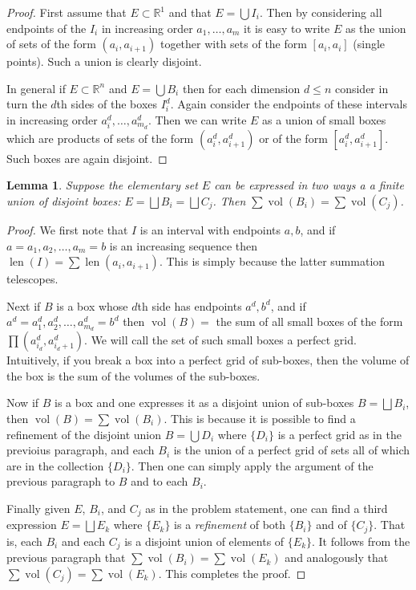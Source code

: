 \documentclass[11pt,oneside]{amsbook}
\newcommand{\RR}{{\mathbb R}}
\DeclareMathOperator{\len}{len}
\DeclareMathOperator{\vol}{vol}
\theoremstyle{definition}
\theoremstyle{plain}
\newtheorem{lem}[thm]{Lemma}
\theoremstyle{definition}
\theoremstyle{remark}
\numberwithin{equation}{section}
\numberwithin{figure}{section}
\begin{document}
\begin{proof}
  First assume that $E\subset\RR^1$ and that $E=\bigcup I_i$. Then by considering all endpoints of the $I_i$ in increasing order $a_1,\ldots,a_m$ it is easy to write $E$ as the union of sets of the form $(a_i,a_{i+1})$ together with sets of the form $[a_i,a_i]$ (single points). Such a union is clearly disjoint.

  In general if $E\subset\RR^n$ and $E=\bigcup B_i$ then for each dimension $d\leq n$ consider in turn the $d$th sides of the boxes $I_i^d$. Again consider the endpoints of these intervals in increasing order $a_i^d,\ldots,a_{m_d}^d$. Then we can write $E$ as a union of small boxes which are products of sets of the form $(a_i^d,a_{i+1}^d)$ or of the form $[a_i^d,a_{i+1}^d]$. Such boxes are again disjoint.
\end{proof}

\begin{lem}
  Suppose the elementary set $E$ can be expressed in two ways a a finite union of disjoint boxes: $E=\bigsqcup B_i=\bigsqcup C_j$. Then $\sum\vol(B_i)=\sum\vol(C_j)$.
\end{lem}

\begin{proof}
  We first note that $I$ is an interval with endpoints $a,b$, and if $a=a_1,a_2,\ldots,a_m=b$ is an increasing sequence then $\len(I)=\sum\len(a_i,a_{i+1})$. This is simply because the latter summation telescopes.
  
  Next if $B$ is a box whose $d$th side has endpoints $a^d,b^d$, and if $a^d=a_1^d,a_2^d,\ldots,a_{m_d}^d=b^d$ then $\vol(B)=$ the sum of all small boxes of the form $\prod(a_{i_d}^d,a_{i_d+1}^d)$. We will call the set of such small boxes a perfect grid. Intuitively, if you break a box into a perfect grid of sub-boxes, then the volume of the box is the sum of the volumes of the sub-boxes.

  Now if $B$ is a box and one expresses it as a disjoint union of sub-boxes $B=\bigsqcup B_i$, then $\vol(B)=\sum\vol(B_i)$. This is because it is possible to find a refinement of the disjoint union $B=\bigcup D_i$ where $\{D_i\}$ is a perfect grid as in the previoius paragraph, and each $B_i$ is the union of a perfect grid of sets all of which are in the collection $\{D_i\}$. Then one can simply apply the argument of the previous paragraph to $B$ and to each $B_i$.

  Finally given $E$, $B_i$, and $C_j$ as in the problem statement, one can find a third expression $E=\bigsqcup E_k$ where $\{E_k\}$ is a \emph{refinement} of both $\{B_i\}$ and of $\{C_j\}$. That is, each $B_i$ and each $C_j$ is a disjoint union of elements of $\{E_k\}$. It follows from the previous paragraph that $\sum\vol(B_i)=\sum\vol(E_k)$ and analogously that $\sum\vol(C_j)=\sum\vol(E_k)$. This completes the proof.
\end{proof}
\end{document}
